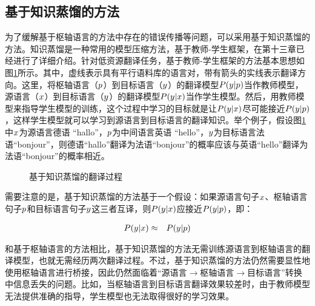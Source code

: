 \subsection{基于知识蒸馏的方法}

\parinterval 为了缓解基于枢轴语言的方法中存在的错误传播等问题，可以采用基于知识蒸馏的方法。知识蒸馏是一种常用的模型压缩方法，基于教师-学生框架，在第十三章已经进行了详细介绍。针对低资源翻译任务，基于教师-学生框架的方法基本思想如图\ref{fig:16-12}所示。其中，虚线表示具有平行语料库的语言对，带有箭头的实线表示翻译方向。这里，将枢轴语言（${p}$）到目标语言（${y}$）的翻译模型${P}({y}|{p})$当作教师模型，源语言（${x}$）到目标语言（${y}$）的翻译模型${P}({y}|{x})$当作学生模型。然后，用教师模型来指导学生模型的训练，这个过程中学习的目标就是让${P}({y}|{x})$尽可能接近${P}({y}|{p})$，这样学生模型就可以学习到源语言到目标语言的翻译知识。举个例子，假设图\ref{fig:16-12}中${x}$为源语言德语 “hallo”，${p}$为中间语言英语 “hello”，${y}$为目标语言法语“bonjour”，则德语“hallo”翻译为法语“bonjour”的概率应该与英语“hello”翻译为法语“bonjour”的概率相近。
\begin{figure}[h]
\centering

\caption{基于知识蒸馏的翻译过程}
\label{fig:16-12}
\end{figure}

\parinterval 需要注意的是，基于知识蒸馏的方法基于一个假设：如果源语言句子${x}$、枢轴语言句子${p}$和目标语言句子${y}$这三者互译，则${P}({y}|{x})$应接近${P}({y}|{p})$，即：

\begin{eqnarray}
{{P}({y}|{x})} & \approx & {{P}({y}|{p})}
\label{eq:16-8}
\end{eqnarray}

\parinterval 和基于枢轴语言的方法相比，基于知识蒸馏的方法无需训练源语言到枢轴语言的翻译模型，也就无需经历两次翻译过程。不过，基于知识蒸馏的方法仍然需要显性地使用枢轴语言进行桥接，因此仍然面临着“源语言$\to$枢轴语言$\to$目标语言”转换中信息丢失的问题。比如，当枢轴语言到目标语言翻译效果较差时，由于教师模型无法提供准确的指导，学生模型也无法取得很好的学习效果。



